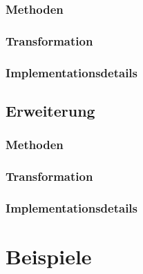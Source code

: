 \documentclass[a4paper,10pt,ngerman]{scrartcl}
\begin{document}
    \subsubsection{Methoden}\label{subsubsec:methoden}

    \subsubsection{Transformation}\label{subsubsec:transformation}

    \subsubsection{Implementationsdetails}\label{subsubsec:implementationsdetails}

    \subsection{Erweiterung}\label{subsec:erweiterung2}

    \subsubsection{Methoden}\label{subsubsec:methoden_erweiterung}

    \subsubsection{Transformation}\label{subsubsec:transformation_erweiterung}

    \subsubsection{Implementationsdetails}\label{subsubsec:implementationsdetails_erweiterung}

    \newpage


    \section{Beispiele}\label{sec:beispiele}
\end{document}
